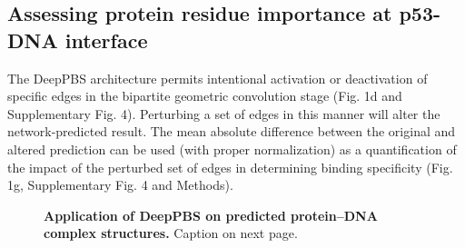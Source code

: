 \subsection{Assessing protein residue importance at p53-DNA interface}
The DeepPBS architecture permits intentional activation or deactivation of specific edges in the bipartite geometric convolution stage (Fig. 1d and Supplementary Fig. 4). Perturbing a set of edges in this manner will alter the network-predicted result. The mean absolute difference between the original and altered prediction can be used (with proper normalization) as a quantification of the impact of the perturbed set of edges in determining binding specificity (Fig. 1g, Supplementary Fig. 4 and Methods).
\begin{center}
    \begin{figure}[H]
        \caption[]{\textbf{Application of DeepPBS on predicted protein–DNA complex structures.} Caption on next page.}
  \label{fig:pdna3}
\end{figure}
\addtocounter{figure}{-1}
\begin{figure} [t!]

\end{figure}
\end{center}
